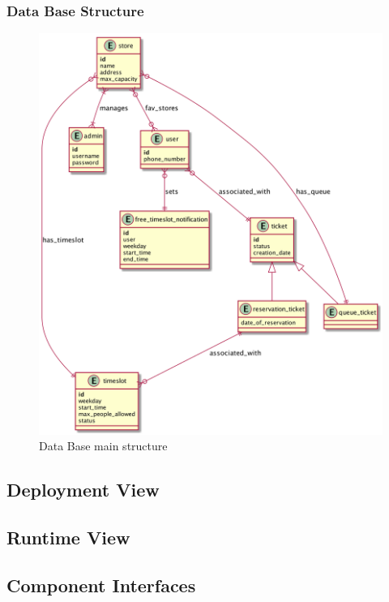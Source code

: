 \subsubsection{Data Base Structure}
\begin{figure}[H]
    \includegraphics[width=\linewidth]{uml/db_structure.png}
    \caption{Data Base main structure}
    \label{fig:db_structure}
\end{figure}




\subsection{Deployment View}

\subsection{Runtime View}

\subsection{Component Interfaces}

